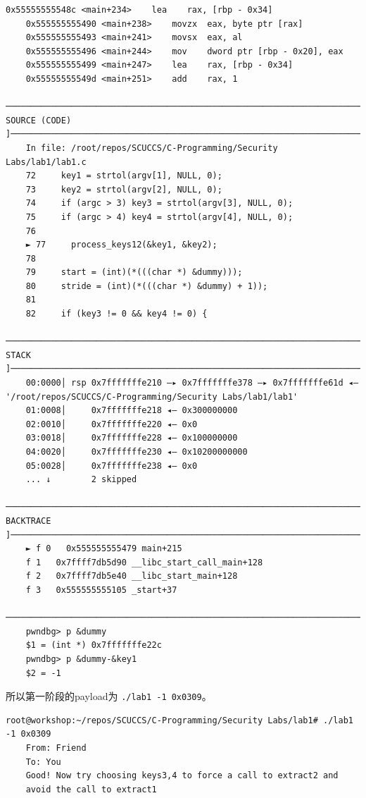 \documentclass[a4pper,12pt,onecolumn]{article}
\begin{document}
\begin{lstlisting}[style=DOS]
    0x55555555548c <main+234>    lea    rax, [rbp - 0x34]
    0x555555555490 <main+238>    movzx  eax, byte ptr [rax]
    0x555555555493 <main+241>    movsx  eax, al
    0x555555555496 <main+244>    mov    dword ptr [rbp - 0x20], eax
    0x555555555499 <main+247>    lea    rax, [rbp - 0x34]
    0x55555555549d <main+251>    add    rax, 1
    ─────────────────────────────────────────────────────────────────────────────────────────[ SOURCE (CODE) ]─────────────────────────────────────────────────────────────────────────────────────────
    In file: /root/repos/SCUCCS/C-Programming/Security Labs/lab1/lab1.c
    72     key1 = strtol(argv[1], NULL, 0);
    73     key2 = strtol(argv[2], NULL, 0);
    74     if (argc > 3) key3 = strtol(argv[3], NULL, 0);
    75     if (argc > 4) key4 = strtol(argv[4], NULL, 0);
    76 
    ► 77     process_keys12(&key1, &key2);
    78 
    79     start = (int)(*(((char *) &dummy)));
    80     stride = (int)(*(((char *) &dummy) + 1));
    81 
    82     if (key3 != 0 && key4 != 0) {
    ─────────────────────────────────────────────────────────────────────────────────────────────[ STACK ]─────────────────────────────────────────────────────────────────────────────────────────────
    00:0000│ rsp 0x7fffffffe210 —▸ 0x7fffffffe378 —▸ 0x7fffffffe61d ◂— '/root/repos/SCUCCS/C-Programming/Security Labs/lab1/lab1'
    01:0008│     0x7fffffffe218 ◂— 0x300000000
    02:0010│     0x7fffffffe220 ◂— 0x0
    03:0018│     0x7fffffffe228 ◂— 0x100000000
    04:0020│     0x7fffffffe230 ◂— 0x10200000000
    05:0028│     0x7fffffffe238 ◂— 0x0
    ... ↓        2 skipped
    ───────────────────────────────────────────────────────────────────────────────────────────[ BACKTRACE ]───────────────────────────────────────────────────────────────────────────────────────────
    ► f 0   0x555555555479 main+215
    f 1   0x7ffff7db5d90 __libc_start_call_main+128
    f 2   0x7ffff7db5e40 __libc_start_main+128
    f 3   0x555555555105 _start+37
    ───────────────────────────────────────────────────────────────────────────────────────────────────────────────────────────────────────────────────────────────────────────────────────────────────
    pwndbg> p &dummy
    $1 = (int *) 0x7fffffffe22c
    pwndbg> p &dummy-&key1
    $2 = -1
\end{lstlisting}

所以第一阶段的payload为 \texttt{./lab1 -1 0x0309}。

\begin{lstlisting}[style=DOS]
    root@workshop:~/repos/SCUCCS/C-Programming/Security Labs/lab1# ./lab1 -1 0x0309
    From: Friend
    To: You
    Good! Now try choosing keys3,4 to force a call to extract2 and
    avoid the call to extract1
\end{lstlisting}
\end{document}
